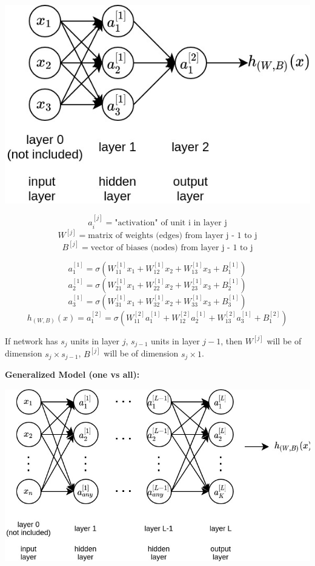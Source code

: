 \documentclass{article}
\begin{document}
\begin{center}
\includegraphics[scale=0.4]{./images/neural_network.jpg}
\end{center}
\[a_i^{[j]} = \text{"activation" of unit i in layer j}\]
\[W^{[j]} = \text{matrix of weights (edges) from layer j - 1 to j}\]
\[B^{[j]} = \text{vector of biases (nodes) from layer j - 1 to j}\]

\[a_1^{[1]} = \sigma(W_{11}^{[1]} x_1 + W_{12}^{[1]} x_2 + W_{13}^{[1]} x_3 + B_{1}^{[1]})\]
\[a_2^{[1]} = \sigma(W_{21}^{[1]} x_1 + W_{22}^{[1]} x_2 + W_{23}^{[1]} x_3 + B_{2}^{[1]})\]
\[a_3^{[1]} = \sigma(W_{31}^{[1]} x_1 + W_{32}^{[1]} x_2 + W_{33}^{[1]} x_3 + B_{3}^{[1]})\]
\[h_{(W, B)}(x) = a_1^{[2]} = \sigma(W_{11}^{[2]} a_1^{[1]} + W_{12}^{[2]} a_2^{[1]} + W_{13}^{[2]} a_3^{[1]} + B_{1}^{[2]})\]

\bigskip

\noindent If network has \(s_j\) units in layer \(j\), \(s_{j - 1}\) units in layer \(j - 1\), then \(W^{[j]}\) will be of dimension \(s_j \times s_{j - 1}\), \(B^{[j]}\) will be of dimension \(s_j \times 1\).

\bigskip

\noindent \textbf{Generalized Model (one vs all):}

\begin{center}
\includegraphics[scale=0.4]{./images/neural_network_generalized.jpg}
\end{center}
\end{document}
